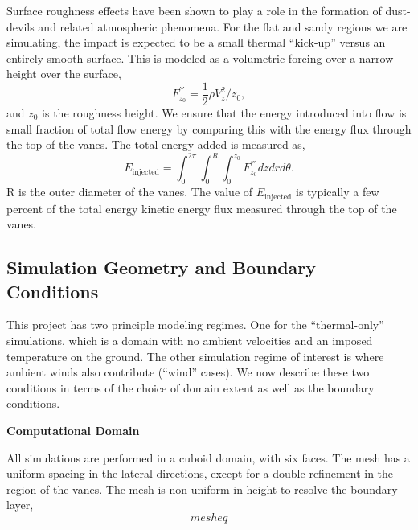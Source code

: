 Surface roughness effects have been shown to play a role in the
formation of dust-devils and related atmospheric
phenomena\cite{oke1987boundary}. For the flat and sandy regions we are
simulating, the impact is expected to be a small thermal ``kick-up''
versus an entirely smooth surface. This is modeled as a volumetric 
forcing over a narrow height over the surface, 
\begin{equation}
 F^{'''}_{z_0} = \frac{1}{2}\rho V_z^2/z_{0}, 
\end{equation}
and $z_{0}$ is the roughness height. We ensure that the energy
introduced into flow is small fraction of total flow energy by comparing
this with the energy flux through the top of the vanes. The total energy
added is measured as,  
\begin{equation}
 E_{\text{injected}} = \int_0^{2\pi} \int_0^R \int_0^{z_0} F^{'''}_{z_0} dz dr d\theta. 
\end{equation}
R is the outer diameter of the vanes. 
The value of $E_{\text{injected}}$ is typically a few percent of the
total energy kinetic energy flux measured through the top of the
vanes.


\subsection{Simulation Geometry and Boundary Conditions}
\label{sec:bc}

This project has two principle modeling regimes. One for the ``thermal-only'' simulations, 
which is a domain with no ambient velocities and an imposed temperature on the ground. 
The other simulation regime of interest is where ambient winds also contribute 
(``wind'' cases). We now describe these two conditions in terms of the choice of domain
extent as well as the boundary conditions. 

\textbf{Computational Domain} 

All simulations are performed in a cuboid domain, with six
faces. The mesh has a uniform spacing in the lateral directions, 
except for a double refinement in the region of the vanes. 
The mesh is  non-uniform in height to resolve the boundary layer, 
\begin{equation}
mesh eq  
\end{equation}

